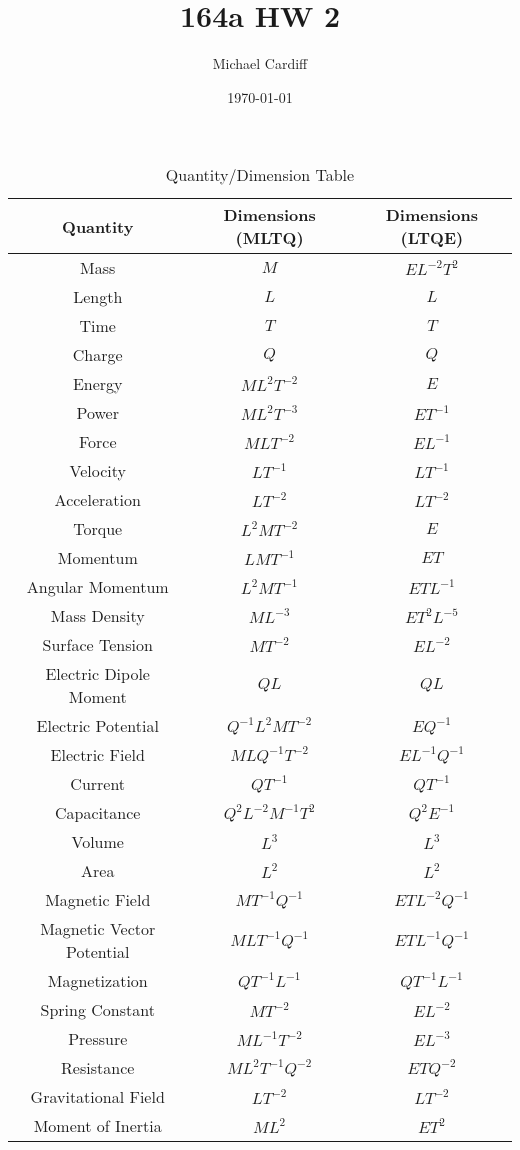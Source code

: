 \documentclass[12pt]{article}
\title{\vspace{-3em}164a HW 2}
\author{Michael Cardiff}
\date{\today}
\begin{document}
\maketitle
\begin{table}[H]
  \centering
  \begin{tabular}{c|c|c}
    Quantity & Dimensions (MLTQ) & Dimensions (LTQE) \\ \hline
    Mass & $M$ & $EL^{-2}T^2$ \\
    Length & $L$ & $L$ \\
    Time & $T$ & $T$ \\
    Charge & $Q$ & $Q$ \\
    Energy & $ML^2T^{-2}$ & $E$ \\
    Power & $ML^2T^{-3}$ & $ET^{-1}$ \\
    Force & $MLT^{-2}$ & $EL^{-1}$ \\
    Velocity & $LT^{-1}$ & $LT^{-1}$ \\
    Acceleration & $LT^{-2}$ & $LT^{-2}$ \\
    Torque &  $L^2MT^{-2}$& $E$ \\
    Momentum & $LMT^{-1}$& $ET$ \\
    Angular Momentum & $L^2MT^{-1}$ & $ETL^{-1}$ \\
    Mass Density & $ML^{-3}$ & $ET^2L^{-5}$ \\
    Surface Tension & $MT^{-2}$ & $EL^{-2}$ \\
    Electric Dipole Moment & $QL$ & $QL$ \\
    Electric Potential & $Q^{-1}L^2MT^{-2}$ & $EQ^{-1}$ \\
    Electric Field & $MLQ^{-1}T^{-2}$ & $EL^{-1}Q^{-1}$ \\
    Current & $QT^{-1}$ & $QT^{-1}$ \\
    Capacitance & $Q^2L^{-2}M^{-1}T^2$ & $Q^2E^{-1} $ \\ \hline
    Volume & $L^3$ & $L^3$ \\
    Area & $L^2$ & $L^2$ \\
    Magnetic Field & $MT^{-1}Q^{-1}$ & $ETL^{-2}Q^{-1}$ \\
    Magnetic Vector Potential & $MLT^{-1}Q^{-1}$ & $ETL^{-1}Q^{-1}$ \\
    Magnetization &  $QT^{-1}L^{-1}$ & $QT^{-1}L^{-1} $ \\
    Spring Constant & $MT^{-2}$ & $EL^{-2}$ \\
    Pressure & $ML^{-1}T^{-2}$ & $EL^{-3}$ \\
    Resistance & $ML^2T^{-1}Q^{-2}$ & $ETQ^{-2}$ \\
    Gravitational Field & $LT^{-2}$ & $LT^{-2}$ \\
    Moment of Inertia & $ML^2$ & $ET^2$
  \end{tabular}
  \caption{Quantity/Dimension Table}
\end{table}
\end{document}
